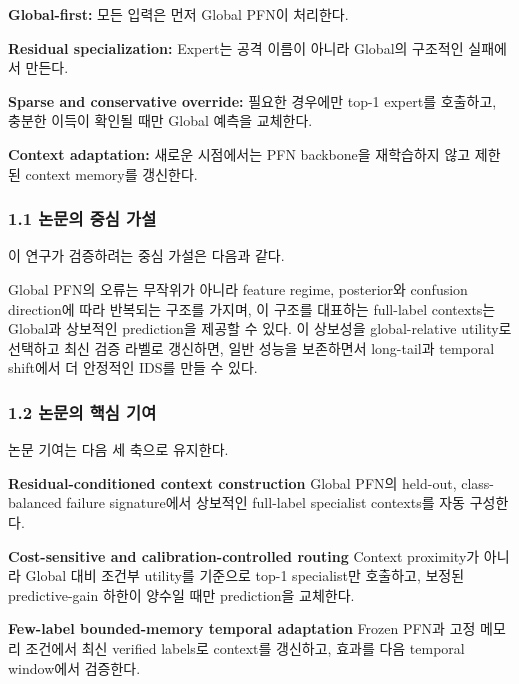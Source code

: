 \par\noindent \textbullet\enspace \textbf{Global-first:} 모든 입력은 먼저 Global PFN이 처리한다.


\par\noindent \textbullet\enspace \textbf{Residual specialization:} Expert는 공격 이름이 아니라 Global의 구조적인 실패에서 만든다.


\par\noindent \textbullet\enspace \textbf{Sparse and conservative override:} 필요한 경우에만 top-1 expert를 호출하고, 충분한 이득이 확인될 때만 Global 예측을 교체한다.


\par\noindent \textbullet\enspace \textbf{Context adaptation:} 새로운 시점에서는 PFN backbone을 재학습하지 않고 제한된 context memory를 갱신한다.


\subsubsection{1.1 논문의 중심 가설}
이 연구가 검증하려는 중심 가설은 다음과 같다.

Global PFN의 오류는 무작위가 아니라 feature regime, posterior와 confusion direction에 따라 반복되는 구조를 가지며, 이 구조를 대표하는 full-label contexts는 Global과 상보적인 prediction을 제공할 수 있다. 이 상보성을 global-relative utility로 선택하고 최신 검증 라벨로 갱신하면, 일반 성능을 보존하면서 long-tail과 temporal shift에서 더 안정적인 IDS를 만들 수 있다.



\subsubsection{1.2 논문의 핵심 기여}
논문 기여는 다음 세 축으로 유지한다.

\par\noindent \textbullet\enspace \textbf{Residual-conditioned context construction} Global PFN의 held-out, class-balanced failure signature에서 상보적인 full-label specialist contexts를 자동 구성한다.


\par\noindent \textbullet\enspace \textbf{Cost-sensitive and calibration-controlled routing} Context proximity가 아니라 Global 대비 조건부 utility를 기준으로 top-1 specialist만 호출하고, 보정된 predictive-gain 하한이 양수일 때만 prediction을 교체한다.


\par\noindent \textbullet\enspace \textbf{Few-label bounded-memory temporal adaptation} Frozen PFN과 고정 메모리 조건에서 최신 verified labels로 context를 갱신하고, 효과를 다음 temporal window에서 검증한다.



